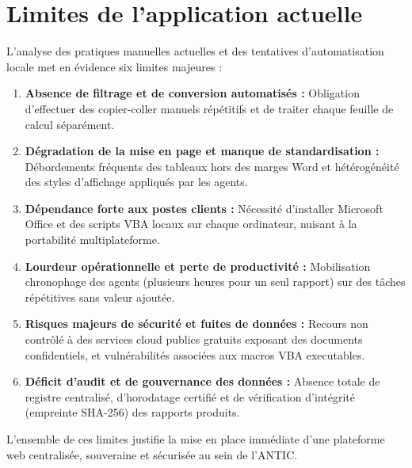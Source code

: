 \chapter{Limites de l'application actuelle}

L'analyse des pratiques manuelles actuelles et des tentatives d'automatisation locale met en évidence six limites majeures :

\begin{enumerate}
    \item \textbf{Absence de filtrage et de conversion automatisés :} Obligation d'effectuer des copier-coller manuels répétitifs et de traiter chaque feuille de calcul séparément.
    \item \textbf{Dégradation de la mise en page et manque de standardisation :} Débordements fréquents des tableaux hors des marges Word et hétérogénéité des styles d'affichage appliqués par les agents.
    \item \textbf{Dépendance forte aux postes clients :} Nécessité d'installer Microsoft Office et des scripts VBA locaux sur chaque ordinateur, nuisant à la portabilité multiplateforme.
    \item \textbf{Lourdeur opérationnelle et perte de productivité :} Mobilisation chronophage des agents (plusieurs heures pour un seul rapport) sur des tâches répétitives sans valeur ajoutée.
    \item \textbf{Risques majeurs de sécurité et fuites de données :} Recours non contrôlé à des services cloud publics gratuits exposant des documents confidentiels, et vulnérabilités associées aux macros VBA executables.
    \item \textbf{Déficit d'audit et de gouvernance des données :} Absence totale de registre centralisé, d'horodatage certifié et de vérification d'intégrité (empreinte SHA-256) des rapports produits.
\end{enumerate}

L'ensemble de ces limites justifie la mise en place immédiate d'une plateforme web centralisée, souveraine et sécurisée au sein de l'ANTIC.
